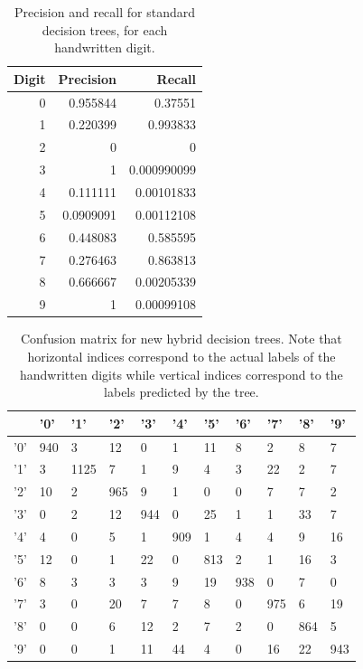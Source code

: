 \begin{table}
	\centering
	\begin{tabular}{rrr}
		Digit &   Precision &      Recall \\
		\hline
		0 &   0.955844  & 0.37551     \\
		1 &   0.220399  & 0.993833    \\
		2 &   0         & 0           \\
		3 &   1         & 0.000990099 \\
		4 &   0.111111  & 0.00101833  \\
		5 &   0.0909091 & 0.00112108  \\
		6 &   0.448083  & 0.585595    \\
		7 &   0.276463  & 0.863813    \\
		8 &   0.666667  & 0.00205339  \\
		9 &   1         & 0.00099108  \\
	\end{tabular}
	\caption{Precision and recall for standard decision trees, for each handwritten digit.}
	\label{table:no_kd_precision_recall}
\end{table}

\begin{table}
	\begin{tabular}{l|llllllllll}
		&   '0' &   '1' &   '2' &   '3' &   '4' &   '5' &   '6' &   '7' &   '8' &   '9' \\
		\hline
		'0' &   940 &     3 &    12 &     0 &     1 &    11 &     8 &     2 &     8 &     7 \\
		'1' &     3 &  1125 &     7 &     1 &     9 &     4 &     3 &    22 &     2 &     7 \\
		'2' &    10 &     2 &   965 &     9 &     1 &     0 &     0 &     7 &     7 &     2 \\
		'3' &     0 &     2 &    12 &   944 &     0 &    25 &     1 &     1 &    33 &     7 \\
		'4' &     4 &     0 &     5 &     1 &   909 &     1 &     4 &     4 &     9 &    16 \\
		'5' &    12 &     0 &     1 &    22 &     0 &   813 &     2 &     1 &    16 &     3 \\
		'6' &     8 &     3 &     3 &     3 &     9 &    19 &   938 &     0 &     7 &     0 \\
		'7' &     3 &     0 &    20 &     7 &     7 &     8 &     0 &   975 &     6 &    19 \\
		'8' &     0 &     0 &     6 &    12 &     2 &     7 &     2 &     0 &   864 &     5 \\
		'9' &     0 &     0 &     1 &    11 &    44 &     4 &     0 &    16 &    22 &   943 \\
	\end{tabular}
	\caption{Confusion matrix for new hybrid decision trees.  Note that horizontal indices correspond to the actual labels of the handwritten digits while vertical indices correspond to the labels predicted by the tree.}
	\label{table:with_kd_confusion}
\end{table}


